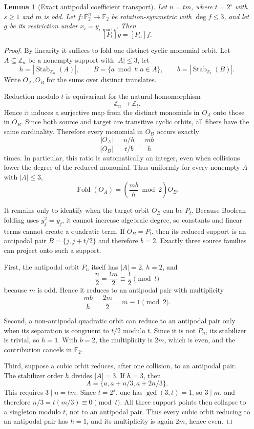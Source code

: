 \documentclass[11pt,a4paper]{article}
\newtheorem{lemma}[theorem]{Lemma}
\theoremstyle{remark}
\theoremstyle{plain}
\newcommand{\F}{\mathbb F_2}
\begin{document}
\begin{lemma}[Exact antipodal coefficient transport]\label{lem:antipodal-transport}
Let $n=tm$, where $t=2^s$ with $s\ge1$ and $m$ is odd. Let $f:\F^n\to\F$ be rotation-symmetric with $\deg f\le3$, and let $g$ be its restriction under $x_i=y_{i\bmod t}$. Then
\[
\boxed{[P_t]g=[P_n]f.}
\]
\end{lemma}
\begin{proof}
By linearity it suffices to fold one distinct cyclic monomial orbit. Let $A\subseteq\mathbb Z_n$ be a nonempty support with $|A|\le3$, let
\[
h=|\operatorname{Stab}_{\mathbb Z_n}(A)|,\qquad
B=\{a\bmod t:a\in A\},\qquad
b=|\operatorname{Stab}_{\mathbb Z_t}(B)|.
\]
Write $O_A,O_B$ for the sums over distinct translates.

Reduction modulo $t$ is equivariant for the natural homomorphism
\[
\mathbb Z_n\longrightarrow\mathbb Z_t.
\]
Hence it induces a surjective map from the distinct monomials in $O_A$ onto those in $O_B$. Since both source and target are transitive cyclic orbits, all fibers have the same cardinality. Therefore every monomial in $O_B$ occurs exactly
\[
\frac{|O_A|}{|O_B|}
=
\frac{n/h}{t/b}
=
\frac{mb}{h}
\]
times. In particular, this ratio is automatically an integer, even when collisions lower the degree of the reduced monomial. Thus uniformly for every nonempty $A$ with $|A|\le3$,
\[
\boxed{
\operatorname{Fold}(O_A)
=
\left(\frac{mb}{h}\bmod2\right)O_B.
}
\tag{*}
\]

It remains only to identify when the target orbit $O_B$ can be $P_t$. Because Boolean folding uses $y_j^2=y_j$, it cannot increase algebraic degree, so constants and linear terms cannot create a quadratic term. If $O_B=P_t$, then its reduced support is an antipodal pair $B=\{j,j+t/2\}$ and therefore $b=2$. Exactly three source families can project onto such a support.

First, the antipodal orbit $P_n$ itself has $|A|=2$, $h=2$, and
\[
\frac n2=\frac{tm}{2}\equiv\frac t2\pmod t
\]
because $m$ is odd. Hence it reduces to an antipodal pair with multiplicity
\[
\frac{mb}{h}=\frac{2m}{2}=m\equiv1\pmod2.
\]

Second, a non-antipodal quadratic orbit can reduce to an antipodal pair only when its separation is congruent to $t/2$ modulo $t$. Since it is not $P_n$, its stabilizer is trivial, so $h=1$. With $b=2$, the multiplicity is $2m$, which is even, and the contribution cancels in $\F$.

Third, suppose a cubic orbit reduces, after one collision, to an antipodal pair. The stabilizer order $h$ divides $|A|=3$. If $h=3$, then
\[
A=\{a,a+n/3,a+2n/3\}.
\]
This requires $3\mid n=tm$. Since $t=2^s$, one has $\gcd(3,t)=1$, so $3\mid m$, and therefore $n/3=t(m/3)\equiv0\pmod t$. All three support points then collapse to a singleton modulo $t$, not to an antipodal pair. Thus every cubic orbit reducing to an antipodal pair has $h=1$, and its multiplicity is again $2m$, hence even.


\end{proof}
\end{document}
